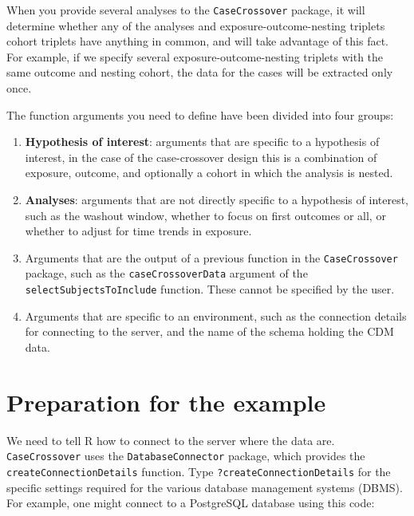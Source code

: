 \documentclass[]{article}
\providecommand{\tightlist}{%
  \setlength{\itemsep}{0pt}\setlength{\parskip}{0pt}}
\begin{document}
When you provide several analyses to the \texttt{CaseCrossover} package,
it will determine whether any of the analyses and
exposure-outcome-nesting triplets cohort triplets have anything in
common, and will take advantage of this fact. For example, if we specify
several exposure-outcome-nesting triplets with the same outcome and
nesting cohort, the data for the cases will be extracted only once.

The function arguments you need to define have been divided into four
groups:

\begin{enumerate}
\def\labelenumi{\arabic{enumi}.}
\tightlist
\item
  \textbf{Hypothesis of interest}: arguments that are specific to a
  hypothesis of interest, in the case of the case-crossover design this
  is a combination of exposure, outcome, and optionally a cohort in
  which the analysis is nested.
\item
  \textbf{Analyses}: arguments that are not directly specific to a
  hypothesis of interest, such as the washout window, whether to focus
  on first outcomes or all, or whether to adjust for time trends in
  exposure.
\item
  Arguments that are the output of a previous function in the
  \texttt{CaseCrossover} package, such as the \texttt{caseCrossoverData}
  argument of the \texttt{selectSubjectsToInclude} function. These
  cannot be specified by the user.
\item
  Arguments that are specific to an environment, such as the connection
  details for connecting to the server, and the name of the schema
  holding the CDM data.
\end{enumerate}

\hypertarget{preparation-for-the-example}{%
\section{Preparation for the
example}\label{preparation-for-the-example}}

We need to tell R how to connect to the server where the data are.
\texttt{CaseCrossover} uses the \texttt{DatabaseConnector} package,
which provides the \texttt{createConnectionDetails} function. Type
\texttt{?createConnectionDetails} for the specific settings required for
the various database management systems (DBMS). For example, one might
connect to a PostgreSQL database using this code:
\end{document}
